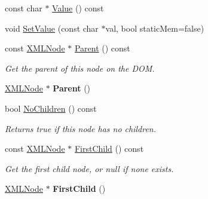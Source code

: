 \begin{DoxyCompactItemize}
\item 
const char $\ast$ \hyperlink{classtinyxml2_1_1XMLNode_a66344989a4b436155bcda72bd6b07b82}{Value} () const
\item 
void \hyperlink{classtinyxml2_1_1XMLNode_a09dd68cf9eae137579f6e50f36487513}{Set\+Value} (const char $\ast$val, bool static\+Mem=false)
\item 
\mbox{\label{classtinyxml2_1_1XMLNode_ae0f62bc186c56c2e0483ebd52dbfbe34}} 
const \hyperlink{classtinyxml2_1_1XMLNode}{X\+M\+L\+Node} $\ast$ \hyperlink{classtinyxml2_1_1XMLNode_ae0f62bc186c56c2e0483ebd52dbfbe34}{Parent} () const
\begin{DoxyCompactList}\small\item\em Get the parent of this node on the D\+OM. \end{DoxyCompactList}\item 
\mbox{\label{classtinyxml2_1_1XMLNode_a76029693a5a54fbb721a41d7a0ca8a97}} 
\hyperlink{classtinyxml2_1_1XMLNode}{X\+M\+L\+Node} $\ast$ {\bfseries Parent} ()
\item 
\mbox{\label{classtinyxml2_1_1XMLNode_ac3ab489e6e202a3cd1762d3b332e89d4}} 
bool \hyperlink{classtinyxml2_1_1XMLNode_ac3ab489e6e202a3cd1762d3b332e89d4}{No\+Children} () const
\begin{DoxyCompactList}\small\item\em Returns true if this node has no children. \end{DoxyCompactList}\item 
\mbox{\label{classtinyxml2_1_1XMLNode_ae7dc225e1018cdd685f7563593a1fe08}} 
const \hyperlink{classtinyxml2_1_1XMLNode}{X\+M\+L\+Node} $\ast$ \hyperlink{classtinyxml2_1_1XMLNode_ae7dc225e1018cdd685f7563593a1fe08}{First\+Child} () const
\begin{DoxyCompactList}\small\item\em Get the first child node, or null if none exists. \end{DoxyCompactList}\item 
\mbox{\label{classtinyxml2_1_1XMLNode_a2d6c70c475146b48bc93a7fafdeff5e0}} 
\hyperlink{classtinyxml2_1_1XMLNode}{X\+M\+L\+Node} $\ast$ {\bfseries First\+Child} ()
\item 

\end{DoxyCompactItemize}
